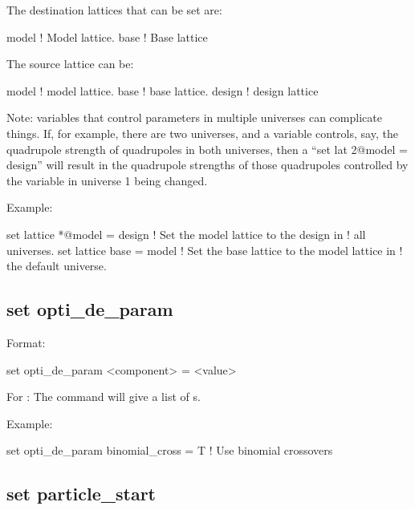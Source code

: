 {{The destination lattices that can be set are:
\begin{example}
  model      ! Model lattice.
  base       ! Base lattice
\end{example}
The source lattice can be:
\begin{example}
  model       ! model lattice.
  base        ! base lattice.
  design      ! design lattice
\end{example}

Note: \tao variables that control parameters in multiple universes can complicate
things. If, for example, there are two universes, and a \tao variable controls, say, the
quadrupole strength of quadrupoles in both universes, then a ``set lat 2@model = design''
will result in the quadrupole strengths of those quadrupoles controlled by the variable in
universe 1 being changed.

Example:
\begin{example}
  set lattice *@model = design  ! Set the model lattice to the design in 
                                !   all universes.
  set lattice base = model      ! Set the base lattice to the model lattice in 
                                !   the default universe.
\end{example}


\subsection{set opti_de_param}
\label{s:set.opti.de.param}

Format:
\begin{example}
  set opti_de_param <component> = <value>
\end{example}

For : The  command will give a list of 
s.

Example:
\begin{example}
  set opti_de_param binomial_cross = T  ! Use binomial crossovers 
\end{example}


\subsection{set particle_start}
\label{s:set.particle.start}

}}
